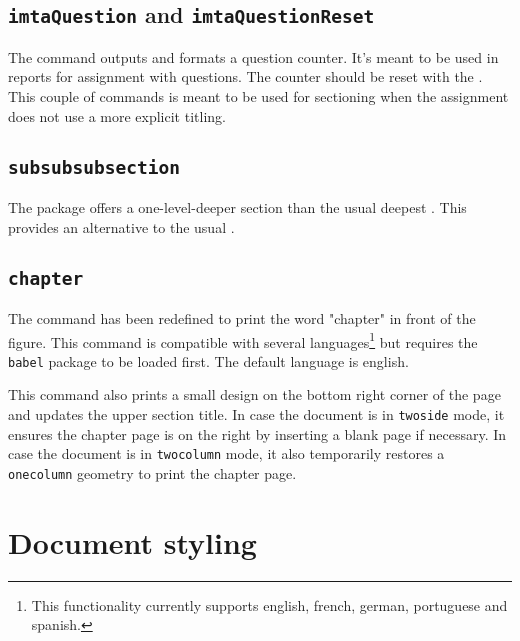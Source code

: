 \documentclass{report}
\begin{document}
\subsection{\texttt{imtaQuestion} and \texttt{imtaQuestionReset}}
The  command outputs and formats a question counter.
It's meant to be used in reports for assignment with questions.
The counter should be reset with the .
This couple of commands is meant to be used for sectioning when the assignment does not use a more explicit titling.


\subsection{\texttt{subsubsubsection}}
The  package offers a one-level-deeper section than the usual deepest .
This provides an alternative to the usual .


\subsection{\texttt{chapter}}
The  command has been redefined to print the word "chapter" in front of the figure. This command is compatible with several languages\footnote{This functionality currently supports english, french, german, portuguese and spanish.} but requires the \texttt{babel} package to be loaded first. The default language is english.

This command also prints a small design on the bottom right corner of the page and updates the upper section title. In case the document is in \texttt{twoside} mode, it ensures the chapter page is on the right by inserting a blank page if necessary. In case the document is in \texttt{twocolumn} mode, it also temporarily restores a \texttt{onecolumn} geometry to print the chapter page.


\section{Document styling}
\end{document}
